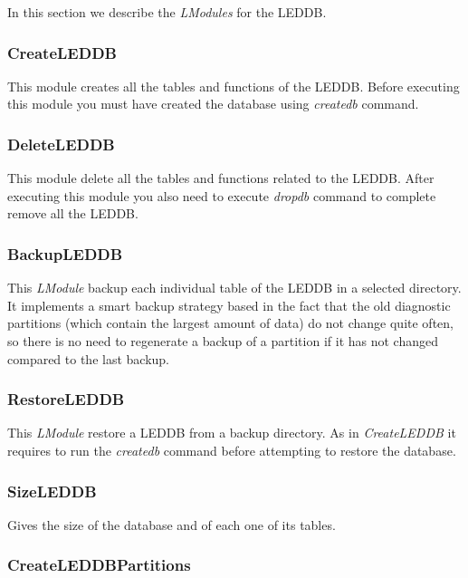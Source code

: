 \documentclass[a4paper,11pt]{article}
\begin{document}
In this section we describe the \textit{LModules} for the LEDDB.

\subsubsection*{CreateLEDDB}

This module creates all the tables and functions of the LEDDB. Before executing this module you must have created the database using \textit{createdb} command.

\subsubsection*{DeleteLEDDB}

This module delete all the tables and functions related to the LEDDB. After executing this module you also need to execute \textit{dropdb} command to complete remove all the LEDDB.

\subsubsection*{BackupLEDDB}

This \textit{LModule} backup each individual table of the LEDDB in a selected directory. It implements a smart backup strategy based in the fact that the old diagnostic partitions (which contain the largest amount of data) do not change quite often, so there is no need to regenerate a backup of a partition if it has not changed compared to the last backup.

\subsubsection*{RestoreLEDDB}

This \textit{LModule} restore a LEDDB from a backup directory. As in \textit{CreateLEDDB} it requires to run the \textit{createdb} command before attempting to restore the database.

\subsubsection*{SizeLEDDB}

Gives the size of the database and of each one of its tables.

\subsubsection*{CreateLEDDBPartitions}
\end{document}

